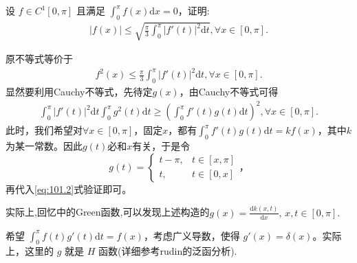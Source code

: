 \documentclass[../../main.tex]{subfiles}%
\begin{document}
\begin{example}设 \(f \in C^1[0, \pi]\) 且满足 \(\int_{0}^{\pi} f(x) \mathrm{d}x = 0\)，证明:
\begin{align*}
|f(x)|\leqslant \sqrt{\frac{\pi}{3}\int_0^{\pi}{|f' (t)|^2\mathrm{d}t}},\forall x\in [0,\pi ].
\end{align*} 
\end{example}
\begin{remark}
原不等式等价于
\begin{align*}
f^2(x) \leqslant \frac{\pi}{3}\int_0^{\pi} |f'(t)|^2\mathrm{d}t, \forall x\in [0, \pi].
\end{align*}
显然要利用Cauchy不等式，先待定\(g(x)\)，由Cauchy不等式可得
\begin{align}
\int_0^{\pi} |f'(t)|^2\mathrm{d}t\int_0^{\pi} g^2(t) \mathrm{d}t\geqslant \left( \int_0^{\pi} f'(t)g(t) \mathrm{d}t \right) ^2, \forall x\in [0, \pi]. \label{eq:101.2}
\end{align}
此时，我们希望对\(\forall x\in [0, \pi]\)，固定\(x\)，都有\(\int_0^{\pi} f'(t)g(t) \mathrm{d}t = kf(x)\)，其中\(k\)为某一常数。因此\(g(t)\)必和\(x\)有关，于是令
\[g(t) = 
\begin{cases}
t - \pi, & t\in [x, \pi]\\
t, & t\in [0, x]
\end{cases}，
\]
再代入\eqref{eq:101.2}式验证即可。

实际上,回忆中的Green函数,可以发现上述构造的$g(x)=\frac{\mathrm{d}k\left( x,t \right)}{\mathrm{d}x},\,x,t\in [0,\pi].$

希望 \(\int_0^{\pi} f(t)g'(t) \mathrm{d}t = f(x)\)，考虑广义导数，使得 \(g'(x) = \delta(x)\)。实际上，这里的 \(g\) 就是 \(H\) 函数(详细参考rudin的泛函分析).
\end{remark}
\end{document}
